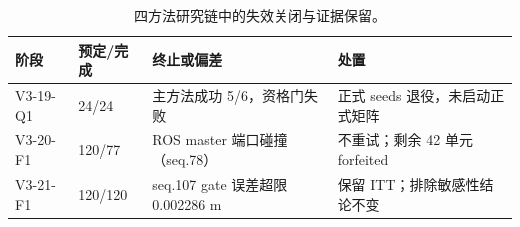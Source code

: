 \begin{table}[htbp]
\centering
\caption{四方法研究链中的失效关闭与证据保留。}
\label{tab:v319-v321-integrity}
\small
\begin{tabular}{llll}
\toprule
阶段 & 预定/完成 & 终止或偏差 & 处置\\
\midrule
V3-19-Q1 & 24/24 & 主方法成功 5/6，资格门失败 & 正式 seeds 退役，未启动正式矩阵\\
V3-20-F1 & 120/77 & ROS master 端口碰撞（seq.78） & 不重试；剩余 42 单元 forfeited\\
V3-21-F1 & 120/120 & seq.107 gate 误差超限 0.002286 m & 保留 ITT；排除敏感性结论不变\\
\bottomrule
\end{tabular}
\end{table}
